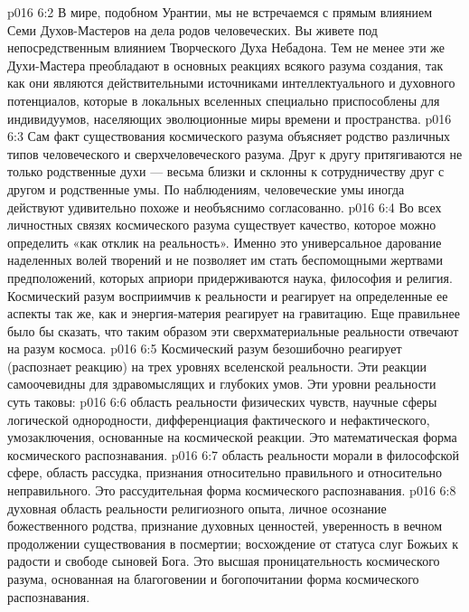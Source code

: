 \vs p016 6:2 В мире, подобном Урантии, мы не встречаемся с прямым влиянием Семи Духов\hyp{}Мастеров на дела родов человеческих. Вы живете под непосредственным влиянием Творческого Духа Небадона. Тем не менее эти же Духи\hyp{}Мастера преобладают в основных реакциях всякого разума создания, так как они являются действительными источниками интеллектуального и духовного потенциалов, которые в локальных вселенных специально приспособлены для индивидуумов, населяющих эволюционные миры времени и пространства.
\vs p016 6:3 Сам факт существования космического разума объясняет родство различных типов человеческого и сверхчеловеческого разума. Друг к другу притягиваются не только родственные духи --- весьма близки и склонны к сотрудничеству друг с другом и родственные умы. По наблюдениям, человеческие умы иногда действуют удивительно похоже и необъяснимо согласованно.
\vs p016 6:4 \pc Во всех личностных связях космического разума существует качество, которое можно определить «как отклик на реальность». Именно это универсальное дарование наделенных волей творений и не позволяет им стать беспомощными жертвами предположений, которых априори придерживаются наука, философия и религия. Космический разум восприимчив к реальности и реагирует на определенные ее аспекты так же, как и энергия\hyp{}материя реагирует на гравитацию. Еще правильнее было бы сказать, что таким образом эти сверхматериальные реальности отвечают на разум космоса.
\vs p016 6:5 Космический разум безошибочно реагирует (распознает реакцию) на трех уровнях вселенской реальности. Эти реакции самоочевидны для здравомыслящих и глубоких умов. Эти уровни реальности суть таковы:
\vs p016 6:6 \bibnobreakspace {} область реальности физических чувств, научные сферы логической однородности, дифференциация фактического и нефактического, умозаключения, основанные на космической реакции. Это математическая форма космического распознавания.
\vs p016 6:7 \bibnobreakspace {} область реальности морали в философской сфере, область рассудка, признания относительно правильного и относительно неправильного. Это рассудительная форма космического распознавания.
\vs p016 6:8 \bibnobreakspace {} духовная область реальности религиозного опыта, личное осознание божественного родства, признание духовных ценностей, уверенность в вечном продолжении существования в посмертии; восхождение от статуса слуг Божьих к радости и свободе сыновей Бога. Это высшая проницательность космического разума, основанная на благоговении и богопочитании форма космического распознавания.
